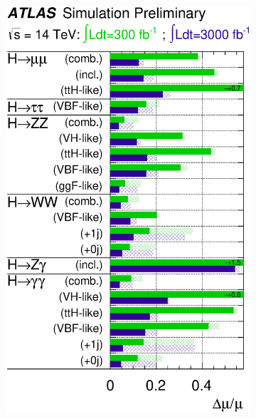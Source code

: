 \begin{figure}[t]
	\begin{subfigure}[t]{0.495\textwidth}
		\centering
		\includegraphics[width=\textwidth]{tex/conclusions/prospects_mu}
	\end{subfigure}
	\hfill
	\begin{subfigure}[t]{0.495\textwidth}
		\centering

\end{subfigure}
\end{figure}
